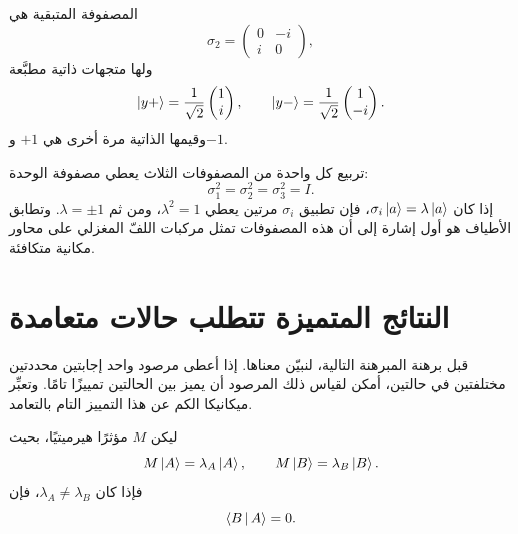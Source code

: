 \begin{classroomqa}
\end{classroomqa}

المصفوفة المتبقية هي
\begin{equation}
  \sigma_2=
  \begin{pmatrix}
    0&-i\\
    i&0
  \end{pmatrix},
\end{equation}
ولها متجهات ذاتية مطبَّعة
\begin{equation}
  \left\lvert y+\right\rangle=\frac{1}{\sqrt2}\begin{pmatrix}1\\i\end{pmatrix},
  \qquad
  \left\lvert y-\right\rangle=\frac{1}{\sqrt2}\begin{pmatrix}1\\-i\end{pmatrix}.
  \label{eq:l03-sigma-two-eigenvectors}
\end{equation}
وقيمها الذاتية مرة أخرى هي \(+1\) و\(-1\).

تربيع كل واحدة من المصفوفات الثلاث يعطي مصفوفة الوحدة:
\begin{equation}
  \sigma_1^2=\sigma_2^2=\sigma_3^2=I.
  \label{eq:l03-pauli-squares}
\end{equation}
إذا كان \(\sigma_i\left\lvert a\right\rangle=\lambda\left\lvert a\right\rangle\)، فإن تطبيق \(\sigma_i\) مرتين يعطي \(\lambda^2=1\)، ومن ثم \(\lambda=\pm1\). وتطابق الأطياف هو أول إشارة إلى أن هذه المصفوفات تمثل مركبات اللفّ المغزلي على محاور مكانية متكافئة.

\section{النتائج المتميزة تتطلب حالات متعامدة}

قبل برهنة المبرهنة التالية، لنبيّن معناها. إذا أعطى مرصود واحد إجابتين محددتين مختلفتين في حالتين، أمكن لقياس ذلك المرصود أن يميز بين الحالتين تمييزًا تامًا. وتعبِّر ميكانيكا الكم عن هذا التمييز التام بالتعامد.

\begin{theorem}
ليكن \(M\) مؤثرًا هيرميتيًا، بحيث
\begin{equation}
  M\left\lvert A\right\rangle=\lambda_A\left\lvert A\right\rangle,
  \qquad
  M\left\lvert B\right\rangle=\lambda_B\left\lvert B\right\rangle.
\end{equation}
فإذا كان \(\lambda_A\ne\lambda_B\)، فإن
\begin{equation}
  \left\langle B\,\middle|\,A\right\rangle=0.
\end{equation}
\end{theorem}

